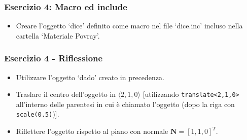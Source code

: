 \documentclass{beamer}
\newcommand{\fig}{figures}
\begin{document}
\begin{frame}
\frametitle{Esercizio 4: Macro ed include}
\begin{itemize}
\item Creare l'oggetto `dice' definito come macro nel file `dice.inc' incluso nella cartella `Materiale Povray'. 
\end{itemize}
\end{frame}
\begin{frame}
\frametitle {Esercizio 4 - Riflessione}
\begin{itemize}
\item Utilizzare l'oggetto `dado' creato in precedenza.
\item Traslare il centro dell'oggetto in   $\langle 2,1,0\rangle$ [utilizzando
\texttt{translate<2,1,0>} all'interno delle parentesi in cui \`e chiamato
l'oggetto (dopo la riga con \texttt{scale(0.5)})].  
\item Riflettere l'oggetto rispetto
al piano con normale $\textbf{N}=[1,1,0]^T$.
\end{itemize}
\end{frame}
\end{document}

